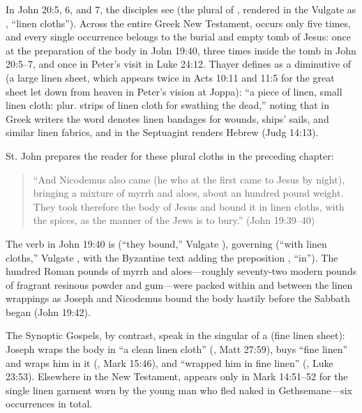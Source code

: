 In John 20:5, 6, and 7, the disciples see  (the plural of , rendered in the Vulgate as , ``linen cloths''). Across the entire Greek New Testament,  occurs only five times, and every single occurrence belongs to the burial and empty tomb of Jesus: once at the preparation of the body in John 19:40, three times inside the tomb in John 20:5--7, and once in Peter's visit in Luke 24:12. Thayer defines  as a diminutive of  (a large linen sheet, which appears twice in Acts 10:11 and 11:5 for the great sheet let down from heaven in Peter's vision at Joppa): ``a piece of linen, small linen cloth: plur. strips of linen cloth for swathing the dead,'' noting that in Greek writers the word denotes linen bandages for wounds, ships' sails, and similar linen fabrics, and in the Septuagint renders Hebrew  (Judg 14:13).

St. John prepares the reader for these plural cloths in the preceding chapter:
\begin{quote}
``And Nicodemus also came (he who at the first came to Jesus by night), bringing a mixture of myrrh and aloes, about an hundred pound weight. They took therefore the body of Jesus and bound it in linen cloths, with the spices, as the manner of the Jews is to bury.'' (John 19:39--40)
\end{quote}
The verb in John 19:40 is  (``they bound,'' Vulgate ), governing  (``with linen cloths,'' Vulgate , with the Byzantine text adding the preposition , ``in''). The hundred Roman pounds of myrrh and aloes---roughly seventy-two modern pounds of fragrant resinous powder and gum---were packed within and between the linen wrappings as Joseph and Nicodemus bound the body hastily before the Sabbath began (John 19:42).

The Synoptic Gospels, by contrast, speak in the singular of a  (fine linen sheet): Joseph wraps the body in ``a clean linen cloth'' (, Matt 27:59), buys ``fine linen'' and wraps him in it (, Mark 15:46), and ``wrapped him in fine linen'' (, Luke 23:53). Elsewhere in the New Testament,  appears only in Mark 14:51--52 for the single linen garment worn by the young man who fled naked in Gethsemane---six occurrences in total.

